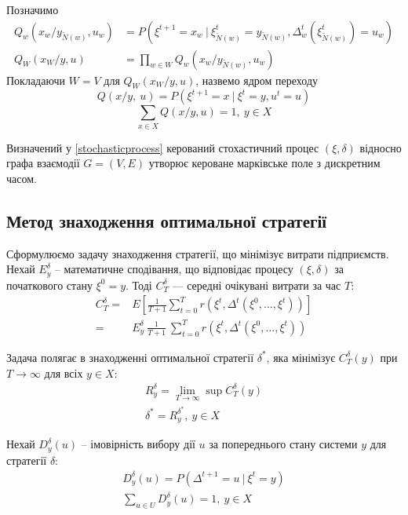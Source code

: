 \documentclass[oneside,14pt]{extarticle}
\begin{document}
\begin{definition} 
Позначимо
\begin{align*}
Q_w(x_w / y_{\tilde{N}(w)}, u_w) &= P(\xi^{t+1} = x_w\ |\ \xi_{\tilde{N}(w)}^t = y_{\tilde{N}(w)}, \Delta_w^t(\xi_{\tilde{N}(w)}^t) = u_w) \\
Q_W(x_W / y, u) &= \prod_{w \in W} Q_w(x_w / y_{\tilde{N}(w)}, u_w)
\end{align*}
Покладаючи \(W = V\) для \( Q_W(x_W / y, u) \), назвемо ядром переходу
\[Q(x/y,\ u) = P(\xi^{t+1} = x\ |\ \xi^t = y, u^t = u)\]
\[\sum_{x \in X}Q(x/y, u) = 1,\ y \in X\]
\end{definition}

Визначений у \ref{stochasticprocess} керований стохастичний процес \((\xi, \delta)\) відносно графа взаємодії \(G = (V, E)\) утворює кероване марківське поле з дискретним часом.








\subsection{Метод знаходження оптимальної стратегії}

Сформулюємо задачу знаходження стратегії, що мінімізує витрати підприємств. Нехай \(E_y^\delta\) – математичне сподівання, що відповідає процесу \((\xi, \delta)\) за початкового стану \(\xi^0 = y\).  Тоді \(C_T^\delta\) — середні очікувані витрати за час \(T\):
\begin{align*}
C_T^{\delta} = &E\left[\frac{1}{T+1}\sum_{t=0}^T r(\xi^t, \Delta^t(\xi^0, \ldots, \xi^t))\right] \\
 = &E_y^\delta\ \frac{1}{T+1}\ \sum_{t=0}^T r(\xi^t, \Delta^t(\xi^0, \ldots, \xi^t))
\end{align*}

Задача полягає в знаходженні оптимальної стратегії \(\delta^*\), яка мінімізує \(C_T^{\delta}(y)\) при \(T\rightarrow\infty\) для всіх \(y \in X\):
\begin{gather*}
R_y^\delta = \lim\limits_{T \rightarrow \infty} \sup C_T^{\delta}(y) \\
\delta^* = R_y^{\delta^*},\ y \in X
\end{gather*}

Нехай \(D_y^{\delta}(u)\) – імовірність вибору дії \(u\) за попереднього стану системи \(y\) для стратегії \(\delta\):
\begin{gather*}
D_y^{\delta}(u) = P(\Delta^{t+1} = u\ |\ \xi^t = y) \\ \sum_{u \in U} D_y^\delta(u) = 1,\ y \in X
\end{gather*}
\end{document}
